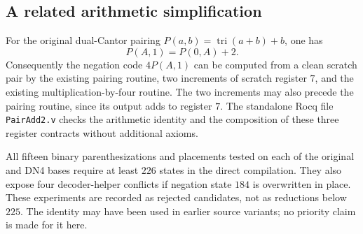 \subsection{A related arithmetic simplification}

For the original dual-Cantor pairing
$P(a,b)=\operatorname{tri}(a+b)+b$, one has
\[
 P(A,1)=P(0,A)+2.
\]
Consequently the negation code $4P(A,1)$ can be computed from a clean
scratch pair by the existing pairing routine, two increments of
scratch register $7$, and the existing multiplication-by-four routine.
The two increments may also precede the pairing routine, since its
output adds to register $7$.  The standalone Rocq file
\texttt{PairAdd2.v} checks the arithmetic identity and the composition
of these three register contracts without additional axioms.

All fifteen binary parenthesizations and placements tested on each of
the original and DN4 bases require at least $226$ states in the direct
compilation.  They also expose four decoder-helper conflicts if
negation state $184$ is overwritten in place.  These experiments are
recorded as rejected candidates, not as reductions below $225$.
The identity may have been used in earlier source variants; no
priority claim is made for it here.
